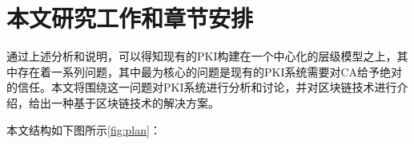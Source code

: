









\section{本文研究工作和章节安排}


通过上述分析和说明，可以得知现有的PKI构建在一个中心化的层级模型之上，其中存在着一系列问题，其中最为核心的问题是现有的PKI系统需要对CA给予绝对的信任。本文将围绕这一问题对PKI系统进行分析和讨论，并对区块链技术进行介绍，给出一种基于区块链技术的解决方案。




本文结构如下图所示\ref{fig:plan}：


